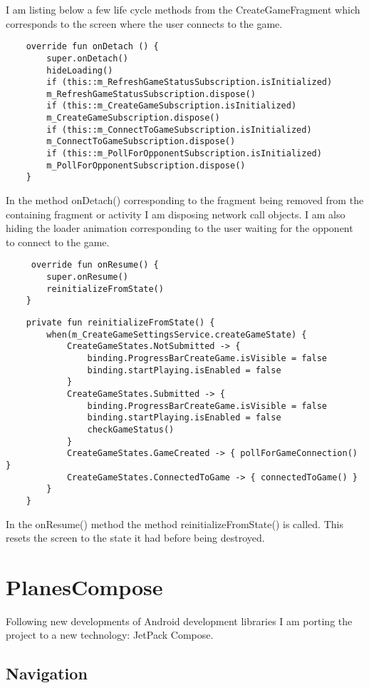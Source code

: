 I am listing below a few life cycle methods from the CreateGameFragment which corresponds to the screen where the user connects to the game.

\begin{lstlisting}
	override fun onDetach () {
		super.onDetach()
		hideLoading()
		if (this::m_RefreshGameStatusSubscription.isInitialized)
		m_RefreshGameStatusSubscription.dispose()
		if (this::m_CreateGameSubscription.isInitialized)
		m_CreateGameSubscription.dispose()
		if (this::m_ConnectToGameSubscription.isInitialized)
		m_ConnectToGameSubscription.dispose()
		if (this::m_PollForOpponentSubscription.isInitialized)
		m_PollForOpponentSubscription.dispose()
	}
\end{lstlisting}

In the method onDetach() corresponding to the fragment being removed from the containing fragment or activity I am disposing network call objects. I am also hiding the loader animation corresponding to the user waiting for the opponent to connect to the game. 

\begin{lstlisting}
	 override fun onResume() {
		super.onResume()
		reinitializeFromState()
	}
\end{lstlisting}

\begin{lstlisting}
	private fun reinitializeFromState() {
		when(m_CreateGameSettingsService.createGameState) {
			CreateGameStates.NotSubmitted -> {
				binding.ProgressBarCreateGame.isVisible = false
				binding.startPlaying.isEnabled = false
			}
			CreateGameStates.Submitted -> {
				binding.ProgressBarCreateGame.isVisible = false
				binding.startPlaying.isEnabled = false
				checkGameStatus()
			}
			CreateGameStates.GameCreated -> { pollForGameConnection() }
			CreateGameStates.ConnectedToGame -> { connectedToGame() }
		}
	}
\end{lstlisting}

In the onResume() method the method reinitializeFromState() is called. This resets the screen to the state it had before being destroyed.

\section{PlanesCompose}

Following new developments of Android development libraries I am porting the project to a new technology: JetPack Compose. 

\subsection{Navigation}

